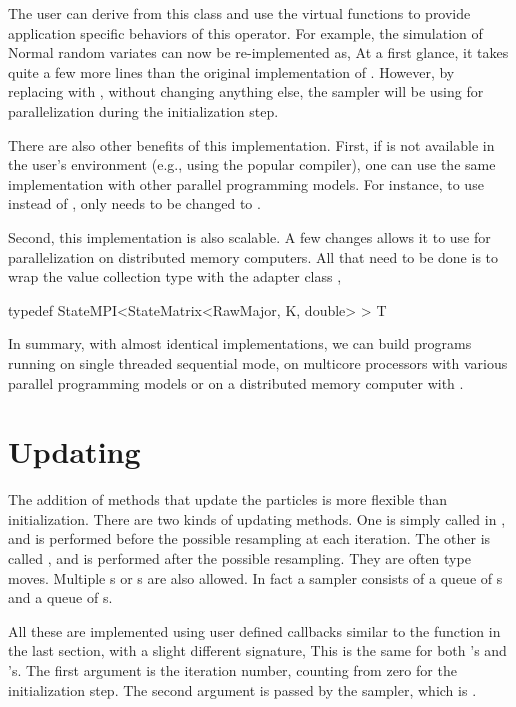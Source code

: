 The user can derive from this class and use the virtual functions to provide application specific behaviors of this operator. For example, the simulation of Normal random variates can now be re-implemented as,
At a first glance, it takes quite a few more lines than the original implementation of . However, by replacing  with , without changing anything else, the sampler will be using \openmp for parallelization during the initialization step.

There are also other benefits of this implementation. First, if \openmp is not available in the user's \cpp environment (e.g., using the popular \clang \cite{clang} compiler), one can use the same implementation with other parallel programming models. For instance, to use \tbb instead of \openmp, only  needs to be changed to .

Second, this implementation is also scalable. A few changes allows it to use \mpi for parallelization on distributed memory computers. All that need to be done is to wrap the value collection type with the adapter class
,
\begin{cppcode}
typedef StateMPI<StateMatrix<RawMajor, K, double> > T
\end{cppcode}

In summary, with almost identical implementations, we can build programs running on single threaded sequential mode, on multicore processors with various parallel programming models or on a distributed memory computer with \mpi.

\section{Updating}
\label{sec:Updating}

The addition of methods that update the particles is more flexible than initialization. There are two kinds of updating methods. One is simply called  in \vsmc, and is performed before the possible resampling at each iteration. The other is called , and is performed after the possible resampling. They are often \mcmc type moves. Multiple s or s are also allowed. In fact a \vsmc sampler consists of a queue of s and a queue of s.

All these are implemented using user defined callbacks similar to the  function in the last section, with a slight different signature,
This is the same for both 's and 's. The first argument is the iteration number, counting from zero for the initialization step. The second argument is passed by the sampler, which is .

